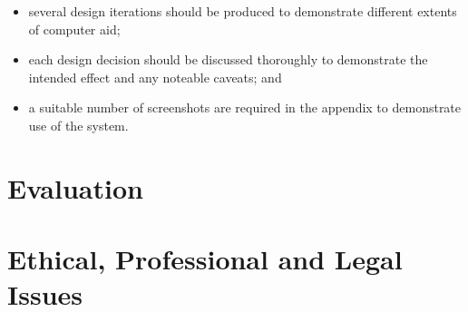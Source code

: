 \begin{itemize}
        \item several design iterations should be produced to demonstrate different extents of computer aid;
        \item each design decision should be discussed thoroughly to demonstrate the intended effect and any noteable caveats; and
        \item a suitable number of screenshots are required in the appendix to demonstrate use of the system.
\end{itemize}

\section{Evaluation}

\section{Ethical, Professional and Legal Issues}

